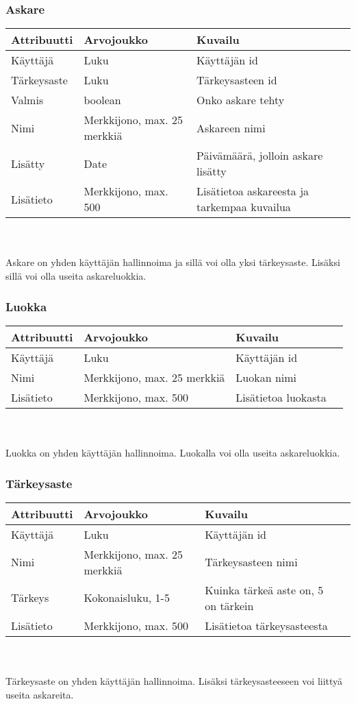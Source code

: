 \documentclass{report}
\begin{document}
\subsubsection*{Askare}
\begin{tabular}{ | l | l | l | p{7.5cm} |} \hline
\textbf{Attribuutti} & \textbf{Arvojoukko} & \textbf{Kuvailu} \\ \hline
Käyttäjä & Luku & Käyttäjän id \\ \hline
Tärkeysaste & Luku & Tärkeysasteen id \\ \hline
Valmis & boolean & Onko askare tehty \\ \hline
Nimi & Merkkijono, max. 25 merkkiä & Askareen nimi \\ \hline
Lisätty & Date & Päivämäärä, jolloin askare lisätty \\ \hline
Lisätieto & Merkkijono, max. 500 & Lisätietoa askareesta ja tarkempaa kuvailua \\ \hline
\end{tabular}
\\ \\ Askare on yhden käyttäjän hallinnoima ja sillä voi olla yksi tärkeysaste. Lisäksi sillä voi olla useita askareluokkia. 

\subsubsection*{Luokka}
\begin{tabular}{ | l | l | l | p{7.5cm} |} \hline
\textbf{Attribuutti} & \textbf{Arvojoukko} & \textbf{Kuvailu} \\ \hline
Käyttäjä & Luku & Käyttäjän id \\ \hline
Nimi & Merkkijono, max. 25 merkkiä & Luokan nimi \\ \hline
Lisätieto & Merkkijono, max. 500 & Lisätietoa luokasta \\ \hline
\end{tabular}
\\ \\ Luokka on yhden käyttäjän hallinnoima. Luokalla voi olla useita askareluokkia.
\subsubsection*{Tärkeysaste}
\begin{tabular}{ | l | l | l | p{7.5cm} |} \hline
\textbf{Attribuutti} & \textbf{Arvojoukko} & \textbf{Kuvailu} \\ \hline
Käyttäjä & Luku & Käyttäjän id \\ \hline
Nimi & Merkkijono, max. 25 merkkiä & Tärkeysasteen nimi \\ \hline
Tärkeys & Kokonaisluku, 1-5 & Kuinka tärkeä aste on, 5 on tärkein \\ \hline
Lisätieto & Merkkijono, max. 500 & Lisätietoa tärkeysasteesta \\ \hline
\end{tabular}
\\ \\ Tärkeysaste on yhden käyttäjän hallinnoima. Lisäksi tärkeysasteeseen voi liittyä useita askareita.
\end{document}
